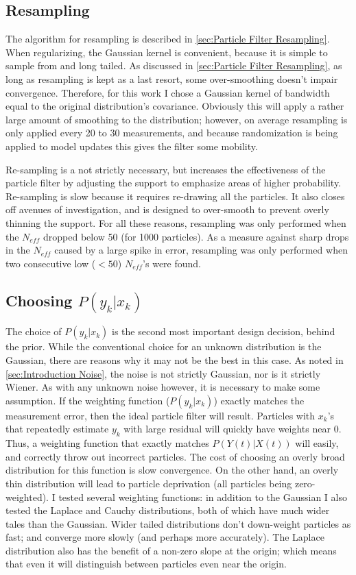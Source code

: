\subsection{Resampling}
\label{sec:Resampling}
The algorithm for resampling is described in \autoref{sec:Particle Filter Resampling}.
When regularizing, the Gaussian kernel is convenient,
because it is simple to sample from and long tailed.
As discussed in \autoref{sec:Particle Filter Resampling},
as long as resampling is kept as a last resort, some over-smoothing
doesn't impair convergence. Therefore, for this work I chose a Gaussian kernel of
bandwidth equal to the original distribution's covariance. Obviously this will
apply a rather large amount of smoothing to the distribution; however, on average
resampling is only applied every 20 to 30 measurements, and because randomization
is being applied to model updates this gives the filter some mobility. 

Re-sampling is a not strictly necessary, but increases the effectiveness
of the particle filter by adjusting the support to emphasize areas
of higher probability. Re-sampling is slow because it requires re-drawing
all the particles. It also closes off avenues of investigation, and is
designed to over-smooth to prevent overly thinning the support. For all these
reasons, resampling was only performed when the $N_{eff}$ dropped below
50 (for 1000 particles).  As a measure against sharp drops in the $N_{eff}$ 
caused by a large spike in error, resampling was only performed when 
two consecutive low ($<50$) $N_{eff}$'s were found. 

\subsection{Choosing $P(y_k | x_k)$}
\label{sec:Methods Weighting Function}
The choice of $P(y_k | x_k)$ is the second most important design decision, behind 
the prior. While the conventional choice for an unknown distribution is the 
Gaussian, there are reasons why it may not be the best in this case.  
As noted in \autoref{sec:Introduction Noise}, the noise is not strictly Gaussian,
nor is it strictly Wiener. As with any unknown noise however, it is necessary 
to make some assumption. If the weighting function ($P(y_k | x_k)$) exactly
matches the measurement error, then the ideal particle filter will result.
Particles with $x_k$'s that repeatedly estimate $y_k$ with large residual 
will quickly have weights near 0. Thus, a weighting function that
exactly matches $P(Y(t) | X(t))$ will easily, and correctly throw out incorrect
particles.  The cost of choosing an overly broad distribution for this
function is slow convergence.  On the other hand, an overly thin 
distribution will lead to particle deprivation (all particles
being zero-weighted).  I tested several weighting
functions: in addition to the Gaussian I also tested the Laplace and Cauchy
distributions, both of which have much wider tales than the Gaussian. 
Wider tailed distributions don't down-weight
particles as fast; and converge more slowly (and perhaps more accurately). 
The Laplace distribution also has the
benefit of a non-zero slope at the origin; which means that even
it will distinguish between particles even near the origin.

